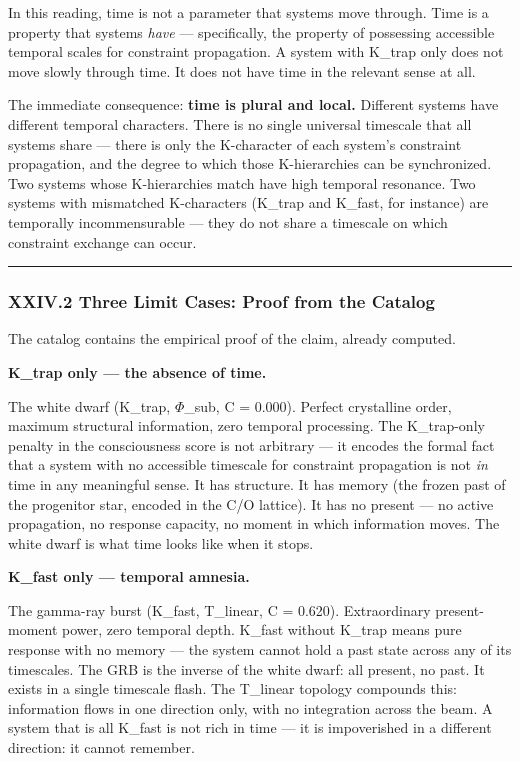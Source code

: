 \documentclass[12pt,a4paper]{article}
\begin{document}
In this reading, time is not a parameter that systems move through. Time is a property that systems \emph{have} --- specifically, the property of possessing accessible temporal scales for constraint propagation. A system with K\_trap only does not move slowly through time. It does not have time in the relevant sense at all.

The immediate consequence: \textbf{time is plural and local.} Different systems have different temporal characters. There is no single universal timescale that all systems share --- there is only the K-character of each system's constraint propagation, and the degree to which those K-hierarchies can be synchronized. Two systems whose K-hierarchies match have high temporal resonance. Two systems with mismatched K-characters (K\_trap and K\_fast, for instance) are temporally incommensurable --- they do not share a timescale on which constraint exchange can occur.

\begin{center}
\rule{0.5\textwidth}{0.4pt}
\end{center}

\subsubsection{XXIV.2 Three Limit Cases: Proof from the Catalog}

The catalog contains the empirical proof of the claim, already computed.

\textbf{K\_trap only --- the absence of time.}

The white dwarf (K\_trap, $\Phi$\_sub, C = 0.000). Perfect crystalline order, maximum structural information, zero temporal processing. The K\_trap-only penalty in the consciousness score is not arbitrary --- it encodes the formal fact that a system with no accessible timescale for constraint propagation is not \emph{in} time in any meaningful sense. It has structure. It has memory (the frozen past of the progenitor star, encoded in the C/O lattice). It has no present --- no active propagation, no response capacity, no moment in which information moves. The white dwarf is what time looks like when it stops.

\textbf{K\_fast only --- temporal amnesia.}

The gamma-ray burst (K\_fast, T\_linear, C = 0.620). Extraordinary present-moment power, zero temporal depth. K\_fast without K\_trap means pure response with no memory --- the system cannot hold a past state across any of its timescales. The GRB is the inverse of the white dwarf: all present, no past. It exists in a single timescale flash. The T\_linear topology compounds this: information flows in one direction only, with no integration across the beam. A system that is all K\_fast is not rich in time --- it is impoverished in a different direction: it cannot remember.
\end{document}

